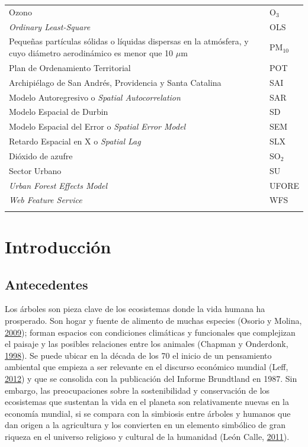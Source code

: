 \documentclass[12pt,a4paper,oneside, openany]{book}
\theoremstyle{definition}
\theoremstyle{definition}
\theoremstyle{definition}
\theoremstyle{remark}
\begin{document}
\begin{longtable}{>{\raggedright\arraybackslash}p{10cm}l}
Ozono & O$_3$\\
\addlinespace
\rowcolor{gray!6}  \textit{Ordinary Least-Square} & OLS\\
Pequeñas partículas sólidas o líquidas dispersas en la atmósfera, y cuyo diámetro aerodinámico es menor que 10 $\mu$m & PM$_{10}$\\
\rowcolor{gray!6}  Plan de Ordenamiento Territorial & POT\\
Archipiélago de San Andrés, Providencia y Santa Catalina & SAI\\
\rowcolor{gray!6}  Modelo Autoregresivo o \textit{Spatial Autocorrelation} & SAR\\
\addlinespace
Modelo Espacial de Durbin & SD\\
\rowcolor{gray!6}  Modelo Espacial del Error o \textit{Spatial Error Model} & SEM\\
Retardo Espacial en X o \textit{Spatial Lag} & SLX\\
\rowcolor{gray!6}  Dióxido de azufre & SO$_2$\\
Sector Urbano & SU\\
\addlinespace
\rowcolor{gray!6}  \textit{Urban Forest Effects Model} & UFORE\\
\textit{Web Feature Service} & WFS\\*
\end{longtable}

\listoffigures

\listoftables

\chapter{Introducción}\label{intro}

\section{Antecedentes}\label{antecedentes}

Los árboles son pieza clave de los ecosistemas donde la vida humana ha
prosperado. Son hogar y fuente de alimento de muchas especies (Osorio y
Molina, \protect\hyperlink{ref-osorio_vuelo_2009}{2009}); forman
espacios con condiciones climáticas y funcionales que complejizan el
paisaje y las posibles relaciones entre los animales (Chapman y
Onderdonk, \protect\hyperlink{ref-chapman_forests_1998}{1998}). Se puede
ubicar en la década de los 70 el inicio de un pensamiento ambiental que
empieza a ser relevante en el discurso económico mundial (Leff,
\protect\hyperlink{ref-leff_pensamiento_2012}{2012}) y que se consolida
con la publicación del Informe Brundtland en 1987. Sin embargo, las
preocupaciones sobre la sostenibilidad y conservación de los ecosistemas
que sustentan la vida en el planeta son relativamente nuevas en la
economía mundial, si se compara con la simbiosis entre árboles y humanos
que dan origen a la agricultura y los convierten en un elemento
simbólico de gran riqueza en el universo religioso y cultural de la
humanidad (León Calle,
\protect\hyperlink{ref-leon_calle_arboles_2011}{2011}).
\end{document}
